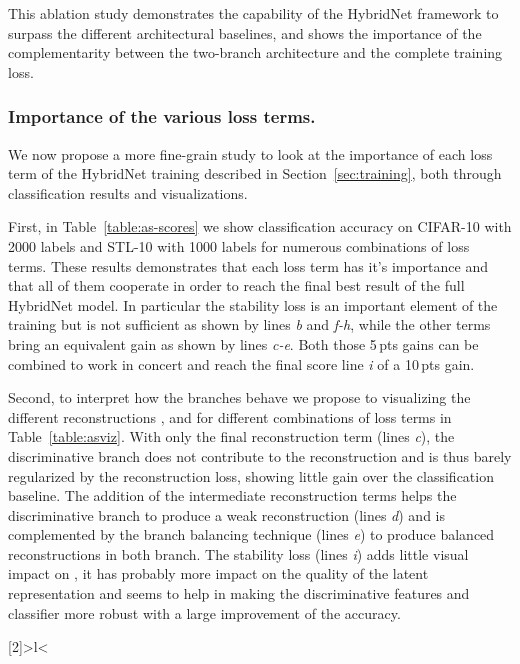 \documentclass[runningheads]{llncs}
\begin{document}
This ablation study demonstrates the capability of the HybridNet framework to surpass the different architectural baselines, and shows the importance of the complementarity between the two-branch architecture and the complete training loss.


\subsubsection{Importance of the various loss terms.} We now propose a more fine-grain study to look at the importance of each loss term of the HybridNet training described in Section~\ref{sec:training}, both through classification results and visualizations.

First, in Table~\ref{table:as-scores} we show classification accuracy on CIFAR-10 with 2000 labels and STL-10 with 1000 labels for numerous combinations of loss terms. These results demonstrates that each loss term has it's importance and that all of them cooperate in order to reach the final best result of the full HybridNet model. In particular the stability loss is an important element of the training but is not sufficient as shown by lines \textit{b} and \textit{f-h}, while the other terms bring an equivalent gain as shown by lines \textit{c-e}. Both those 5\,pts gains can be combined to work in concert and reach the final score line \textit{i} of a 10\,pts gain.

Second, to interpret how the branches behave we propose to visualizing the different reconstructions ,  and  for different combinations of loss terms in Table~\ref{table:asviz}. With only the final reconstruction term (lines \textit{c}), the discriminative branch does not contribute to the reconstruction and is thus barely regularized by the reconstruction loss, showing little gain over the classification baseline. The addition of the intermediate reconstruction terms helps the discriminative branch to produce a weak reconstruction (lines \textit{d}) and is complemented by the branch balancing technique (lines \textit{e}) to produce balanced reconstructions in both branch. The stability loss (lines \textit{i}) adds little visual impact on , it has probably more impact on the quality of the latent representation  and seems to help in making the discriminative features and classifier more robust with a large improvement of the accuracy.


\newcolumntype{R}[2]{>{\bgroup}l<{\egroup}}

\newcommand{\rowmidlinewc}{\arrayrulecolor{verylightgray}\cmidrule{1-8}
            \arrayrulecolor{black}}
\newcommand{\rowmidlinewcb}{\arrayrulecolor{verylightgray}\cmidrule{1-5}
            \arrayrulecolor{black}}
\end{document}
